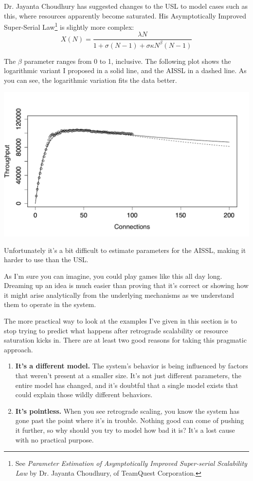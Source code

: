\documentclass{vivid_layout}
\begin{document}
Dr. Jayanta Choudhury has suggested changes to the USL to model cases such as this,
where resources apparently become saturated.  His 
Asymptotically Improved Super-Serial Law\footnote{See {\itshape Parameter
Estimation of Asymptotically Improved Super-serial Scalability Law} by Dr.
Jayanta Choudhury, of TeamQuest Corporation.} is slightly more complex:
\begin{equation}
X(N) = \frac{\lambda N}{1 + \sigma(N-1) + \sigma \kappa N^\beta (N-1)}
\label{aissl}
\end{equation}

The $\beta$ parameter ranges from 0 to 1, inclusive. The following plot shows
the logarithmic variant I proposed in a solid line, and the AISSL in a dashed
line. As you can see, the logarithmic variation fits the data better.
\begin{center}
\includegraphics[width=.85\linewidth]{scalability/aissl}
\end{center}

Unfortunately it's a bit difficult to estimate parameters for the AISSL, making
it harder to use than the USL. 

As I'm sure you can imagine, you could play games like this all day long.
Dreaming up an idea is much easier than proving that it's correct or showing
how it might arise analytically from the underlying mechanisms as we understand
them to operate in the system.

The more practical way to look at the examples I've given in this section is to
stop trying to predict what happens after retrograde scalability or resource
saturation kicks in. There are at least two good reasons for taking this
pragmatic approach.

\begin{enumerate}
\item {\bfseries It's a different model.} The system's behavior is being
influenced by factors that weren't present at a smaller size. It's not just
different parameters, the entire model has changed, and it's doubtful that a
single model exists that could explain those wildly different behaviors.
\item {\bfseries It's pointless.}  When you see retrograde scaling, you know the
system has gone past the point where it's in trouble. Nothing good can come of
pushing it further, so why should you try to model how bad it is? It's a lost
cause with no practical purpose.
\end{enumerate}
\end{document}
